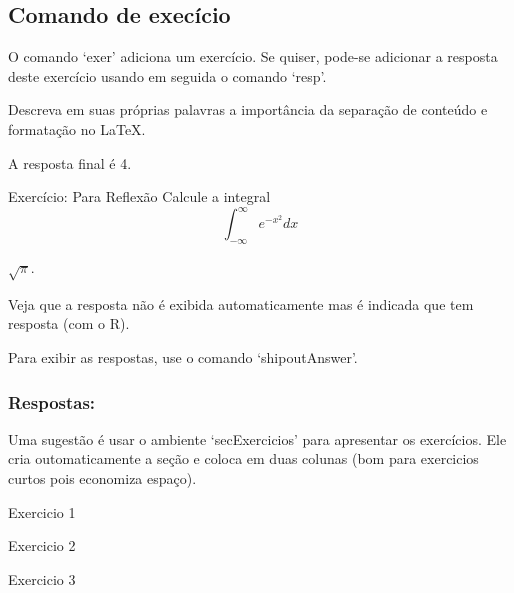 \subsection{Comando de execício}
O comando `exer' adiciona um exercício. Se quiser, pode-se adicionar a resposta deste exercício usando em seguida o comando `resp'.

\begin{exer}
Descreva em suas próprias palavras a importância da separação de conteúdo e formatação no LaTeX.
\end{exer}
\begin{resp}
    A resposta final é 4.
\end{resp}

\begin{exer}{Exercício: Para Reflexão}
Calcule a integral
\begin{equation*}
    \int_{-\infty}^\infty e^{-x^2}dx
\end{equation*}
\end{exer}
\begin{resp}
    $\sqrt{\pi}$.
\end{resp}

Veja que a resposta não é exibida automaticamente mas é indicada que tem resposta (com o R).

Para exibir as respostas, use o comando `shipoutAnswer'.

\subsubsection{Respostas:}
\shipoutAnswer


\begin{obs}
    Uma sugestão é usar o ambiente `secExercicios' para apresentar os exercícios. Ele cria outomaticamente a seção e coloca em duas colunas (bom para exercicios curtos pois economiza espaço).
\end{obs}
\begin{secExercicios}
\begin{exer}
    Exercicio 1
\end{exer}

\begin{exer}
    Exercicio 2
\end{exer}

\begin{exer}
    Exercicio 3
\end{exer}
\end{secExercicios}

